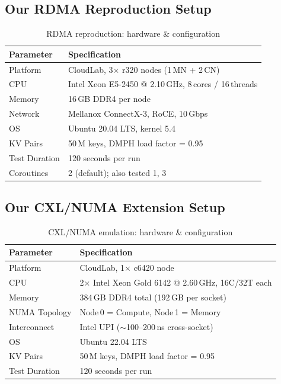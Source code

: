 \documentclass[conference]{IEEEtran}
\begin{document}
\subsection{Our RDMA Reproduction Setup}

\begin{table}[H]
\centering
\caption{RDMA reproduction: hardware \& configuration}
\label{tab:rdma-setup}
\begin{tabular}{@{}ll@{}}
\toprule
\textbf{Parameter} & \textbf{Specification} \\
\midrule
Platform   & CloudLab, 3$\times$ r320 nodes (1\,MN + 2\,CN) \\
CPU        & Intel Xeon E5-2450 @ 2.10\,GHz, 8\,cores / 16\,threads \\
Memory     & 16\,GB DDR4 per node \\
Network    & Mellanox ConnectX-3, RoCE, 10\,Gbps \\
OS         & Ubuntu 20.04 LTS, kernel 5.4 \\
KV Pairs   & 50\,M keys, DMPH load factor = 0.95 \\
Test Duration & 120 seconds per run \\
Coroutines & 2 (default); also tested 1, 3 \\
\bottomrule
\end{tabular}
\end{table}

\subsection{Our CXL/NUMA Extension Setup}

\begin{table}[H]
\centering
\caption{CXL/NUMA emulation: hardware \& configuration}
\label{tab:numa-setup}
\begin{tabular}{@{}ll@{}}
\toprule
\textbf{Parameter} & \textbf{Specification} \\
\midrule
Platform     & CloudLab, 1$\times$ c6420 node \\
CPU          & 2$\times$ Intel Xeon Gold 6142 @ 2.60\,GHz, 16C/32T each \\
Memory       & 384\,GB DDR4 total (192\,GB per socket) \\
NUMA Topology & Node\,0 = Compute, Node\,1 = Memory \\
Interconnect & Intel UPI ($\sim$100--200\,ns cross-socket) \\
OS           & Ubuntu 22.04 LTS \\
KV Pairs     & 50\,M keys, DMPH load factor = 0.95 \\
Test Duration & 120 seconds per run \\
\bottomrule
\end{tabular}
\end{table}
\end{document}

